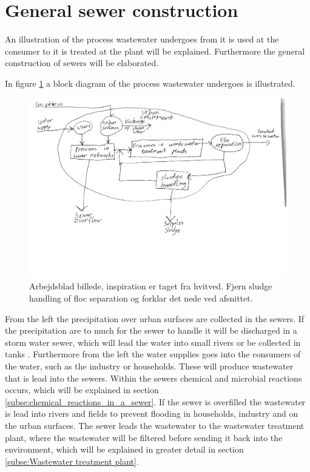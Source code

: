 \section{General sewer construction}\label{se:sewer_construction}
An illustration of the process wastewater undergoes from it is used at the consumer to it is treated at the plant will be explained. Furthermore the general construction of sewers will be elaborated.    

In figure \ref{fig:sewer_overview_of_the_different_parts} a block diagram of the process wastewater undergoes is illustrated.
\begin{figure}[H]
\centering
\includegraphics[width=1\textwidth]{report/introduction/pictures/sewer_process2.pdf}
\caption{Arbejdsblad billede, inspiration er taget fra hvitved. Fjern sludge handling of floc separation og forklar det nede ved afsnittet.}
\label{fig:sewer_overview_of_the_different_parts}
\end{figure}
From the left the precipitation over urban surfaces are collected in the sewers. If the precipitation are to much for the sewer to handle it will be discharged in a storm water sewer, which will lead the water into small rivers or be collected in tanks . Furthermore from the left the water supplies goes into the consumers of the water, such as the industry or households. These will produce wastewater that is lead into the sewers. Within the sewers chemical and microbial reactions occurs, which will be explained in section \ref{subse:chemical_reactions_in_a_sewer}. If the sewer is overfilled the wastewater is lead into rivers and fields to prevent flooding in households, industry and on the urban surfaces. The sewer leads the wastewater to the wastewater treatment plant, where the wastewater will be filtered before sending it back into the environment, which will be explained in greater detail in section \ref{subse:Wastewater treatment plant}. 

